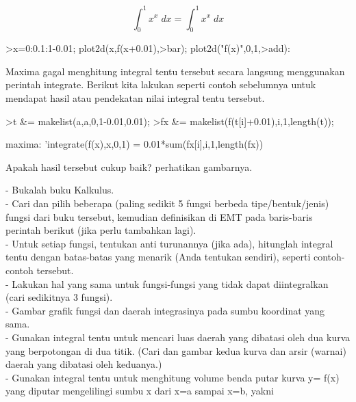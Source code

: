 \documentclass{article}
\begin{document}
\begin{eulernotebook}
\begin{eulercomment}
\begin{eulercomment}
\begin{euleroutput}
\end{euleroutput}
\begin{eulerformula}
\[
\int_{0}^{1}{x^{x}\;dx}=\int_{0}^{1}{x^{x}\;dx}
\]
\end{eulerformula}
\begin{eulerprompt}
>x=0:0.1:1-0.01; plot2d(x,f(x+0.01),>bar); plot2d("f(x)",0,1,>add):
\end{eulerprompt}
\begin{eulercomment}
Maxima gagal menghitung integral tentu tersebut secara langsung menggunakan perintah
integrate. Berikut kita lakukan seperti contoh sebelumnya untuk mendapat hasil atau
pendekatan nilai integral tentu tersebut.
\end{eulercomment}
\begin{eulerprompt}
>t &= makelist(a,a,0,1-0.01,0.01);
>fx &= makelist(f(t[i]+0.01),i,1,length(t));
\end{eulerprompt}
\begin{eulercomment}
maxima: 'integrate(f(x),x,0,1) = 0.01*sum(fx[i],i,1,length(fx))

Apakah hasil tersebut cukup baik? perhatikan gambarnya.
\end{eulercomment}
\begin{eulercomment}
- Bukalah buku Kalkulus.\\
- Cari dan pilih beberapa (paling sedikit 5 fungsi berbeda
tipe/bentuk/jenis) fungsi dari buku tersebut, kemudian definisikan di
EMT pada baris-baris perintah berikut (jika perlu tambahkan lagi).\\
- Untuk setiap fungsi, tentukan anti turunannya (jika ada), hitunglah
integral tentu dengan batas-batas yang menarik (Anda tentukan
sendiri), seperti contoh-contoh tersebut.\\
- Lakukan hal yang sama untuk fungsi-fungsi yang tidak dapat
diintegralkan (cari sedikitnya 3 fungsi).\\
- Gambar grafik fungsi dan daerah integrasinya pada sumbu koordinat
yang sama.\\
- Gunakan integral tentu untuk mencari luas daerah yang dibatasi oleh
dua kurva yang berpotongan di dua titik. (Cari dan gambar kedua kurva
dan arsir (warnai) daerah yang dibatasi oleh keduanya.)\\
- Gunakan integral tentu untuk menghitung volume benda putar kurva y=
f(x) yang diputar mengelilingi sumbu x dari x=a sampai x=b, yakni


\end{eulercomment}
\end{eulercomment}
\end{eulercomment}
\end{eulernotebook}
\end{document}
